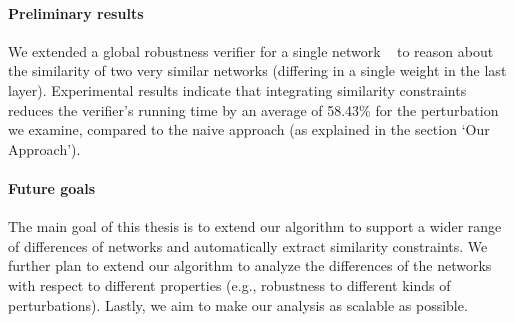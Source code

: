 \paragraph{Preliminary results}
We extended a global robustness verifier for a single network ~\cite{VHAGAR,MEASURENNROBCON,GLOBALPROPERTY} to reason about the similarity of two very similar networks (differing in a single weight in the last layer). 
Experimental results indicate that integrating similarity constraints reduces the verifier’s running time by an average of 58.43\% for the perturbation we examine, compared to the naive approach (as explained in the section ‘Our Approach’).


\paragraph{Future goals}
The main goal of this thesis is to extend our algorithm to support a wider range of differences of networks and automatically extract similarity constraints. We further plan to extend our algorithm to analyze the differences of the networks with respect to different properties (e.g., robustness to different kinds of perturbations). Lastly, we aim to make our analysis as scalable as possible. 